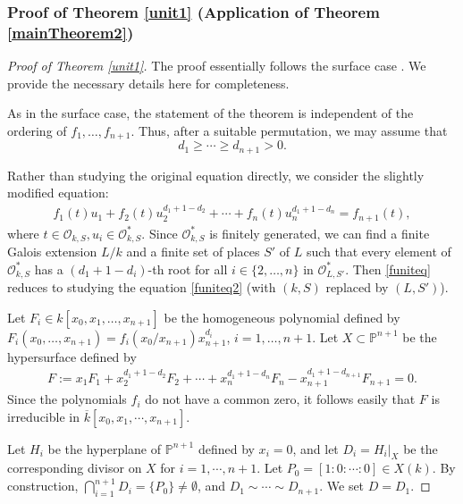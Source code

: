 \documentclass[10pt]{amsart}
\numberwithin{equation}{section}
\theoremstyle{plain}
\theoremstyle{definition}
\begin{document}
\subsubsection{\bf Proof of Theorem  \ref{unit1} (Application of Theorem \ref{mainTheorem2})}\label{Secunit1}
 
\begin{proof}[Proof of Theorem  \ref{unit1}]
The proof essentially follows the surface case \cite[Theorem 5.14]{HLX}. We provide the necessary details here for completeness.

As in the surface case, the statement of the theorem is independent of the ordering of $f_1,\ldots,f_{n+1}$. Thus, after a suitable permutation, we may assume that
\[
d_1\geq \cdots \geq d_{n+1}>0.
\]

 
Rather than studying the original equation directly, we consider the slightly modified equation:
\begin{align}
\label{funiteq2}
f_1(t)u_1+f_2(t)u_2^{d_1+1-d_2}+\cdots +f_{n}(t)u_n^{d_1+1-d_n}=f_{n+1}(t),
\end{align}
where $t\in \mathcal{O}_{k,S}, u_i \in \mathcal{O}_{k,S}^*$.
Since $\mathcal{O}_{k,S}^*$ is finitely generated, we can find a finite Galois extension  $L/k$ and a finite set of places $S'$ of $L$ such that every element of $\mathcal{O}_{k,S}^*$ has a $(d_1+1-d_i)$-th root for all $i \in \{2,\ldots,n\}$ in $\mathcal{O}_{L,S'}^*$. Then \eqref{funiteq} reduces to studying the equation \eqref{funiteq2} (with $(k,S)$ replaced by $(L,S')$). 


Let $F_i\in k[x_0,x_1,\ldots,x_{n+1}]$ be the homogeneous polynomial defined by $F_i(x_0,\dots,x_{n+1})=f_i(x_0/x_{n+1})x_{n+1}^{d_i}$, $i=1,\ldots,n+1$. Let $X\subset \mathbb{P}^{n+1}$ be the hypersurface defined by 
\begin{align*}
F:=x_1F_1+x_2^{d_1+1-d_2}F_2+\cdots +x_{n}^{d_1+1-d_n}F_n-x_{n+1}^{d_1+1-d_{n+1}}F_{n+1}=0.
\end{align*}
Since the polynomials $f_i$ do not have a common zero, it follows easily that $F$ is irreducible in $\overline{k}[x_0,x_1,\cdots,x_{n+1}]$.

Let $H_i$ be the hyperplane of $\mathbb{P}^{n+1}$ defined by $x_i=0$,  and let $D_i=H_i|_X$ be the corresponding divisor on $X$ for $i=1,\cdots,n+1$.   
 Let $P_0=[1:0:\cdots:0]\in X(k)$.  By construction,
 $\bigcap_{i=1}^{n+1} D_i=\{P_0\}\neq \emptyset$, and  $D_1\sim \cdots \sim D_{n+1}$.  We set $D=D_1$. 


\end{proof}
\end{document}
